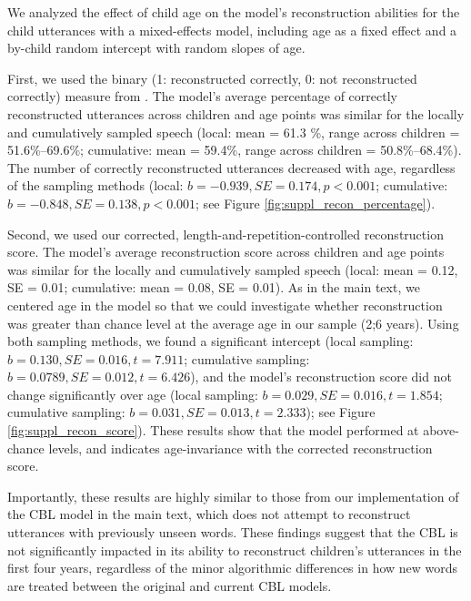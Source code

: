 \documentclass{article}
\begin{document}
We analyzed the effect of child age on the model's reconstruction abilities for the child utterances with a mixed-effects model, including age as a fixed effect and a by-child random intercept with random slopes of age. 

First, we used the binary (1: reconstructed correctly, 0: not reconstructed correctly) measure from \cite{mccauley2011learning, mccauley2014acquiring}. The model's average percentage of correctly reconstructed utterances across children and age points was similar for the locally and cumulatively sampled speech (local: mean = 61.3 \%, range across children = 51.6\%--69.6\%; cumulative: mean = 59.4\%, range across children = 50.8\%--68.4\%). The number of correctly reconstructed utterances decreased with age, regardless of the sampling methods (local: $b = -0.939, SE = 0.174, p < 0.001$; cumulative: $b = -0.848, SE = 0.138, p < 0.001$; see Figure \ref{fig:suppl_recon_percentage}).

Second, we used our corrected, length-and-repetition-controlled reconstruction score. The model's average reconstruction score across children and age points was similar for the locally and cumulatively sampled speech (local: mean = 0.12, SE = 0.01; cumulative: mean = 0.08, SE = 0.01). As in the main text, we centered age in the model so that we could investigate whether reconstruction was greater than chance level at the average age in our sample (2;6 years). Using both sampling methods, we found a significant intercept (local sampling: $b = 0.130, SE = 0.016, t = 7.911$; cumulative sampling: $b = 0.0789, SE = 0.012, t = 6.426$), and the model's reconstruction score did not change significantly over age (local sampling: $b = 0.029, SE = 0.016, t = 1.854$; cumulative sampling: $b = 0.031, SE = 0.013, t = 2.333$); see Figure \ref{fig:suppl_recon_score}). These results show that the model performed at above-chance levels, and indicates age-invariance with the corrected reconstruction score.

Importantly, these results are highly similar to those from our implementation of the CBL model in the main text, which does not attempt to reconstruct utterances with previously unseen words. These findings suggest that the CBL is not significantly impacted in its ability to reconstruct children's utterances in the first four years, regardless of the minor algorithmic differences in how new words are treated between the original and current CBL models.
\end{document}
